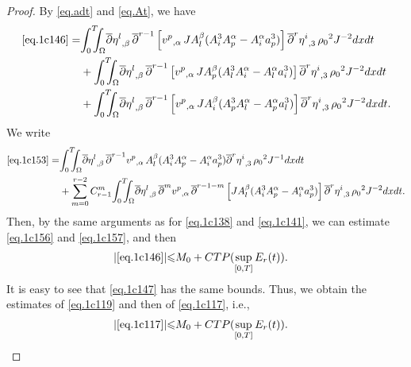 \documentclass[12pt,twoside,reqno]{amsart}
\numberwithin{equation}{section}
\theoremstyle{definition}
\theoremstyle{remark}
\begin{document}
\begin{proof}
By \eqref{eq.adt} and \eqref{eq.At}, we have
\begin{align}
  \eqref{eq.1c146}=&{\int_0^T\!\!\!\!\int_\Omega }  {\overline{\partial}} {{{\eta^l}}_{,{\beta}}\,}{\overline{\partial}}^{r-1}\left[{{{v^p}}_{,{\alpha}}\,}JA^\beta_l(A^3_iA^\alpha_p-A^\alpha_ia^3_p) \right]{{{{\overline{\partial}}^r \eta^i}}_{,{3}}\,}{\rho_0}^2  J^{-2}dxdt\label{eq.1c153}\\
  &+{\int_0^T\!\!\!\!\int_\Omega }  {\overline{\partial}} {{{\eta^l}}_{,{\beta}}\,}{\overline{\partial}}^{r-1}\left[{{{v^p}}_{,{\alpha}}\,}JA^\beta_p(A^3_lA^\alpha_i-A^\alpha_la^3_i) \right]{{{{\overline{\partial}}^r \eta^i}}_{,{3}}\,}{\rho_0}^2  J^{-2}dxdt\label{eq.1c154}\\
  &+{\int_0^T\!\!\!\!\int_\Omega }  {\overline{\partial}} {{{\eta^l}}_{,{\beta}}\,}{\overline{\partial}}^{r-1}\left[{{{v^p}}_{,{\alpha}}\,}JA^\beta_i(A^3_pA^\alpha_l-A^\alpha_pa^3_l) \right]{{{{\overline{\partial}}^r \eta^i}}_{,{3}}\,}{\rho_0}^2  J^{-2}dxdt.\label{eq.1c155}
\end{align}
We write
\begin{align}
  \eqref{eq.1c153}=&{\int_0^T\!\!\!\!\int_\Omega }  {\overline{\partial}} {{{\eta^l}}_{,{\beta}}\,}{\overline{\partial}}^{r-1}{{{v^p}}_{,{\alpha}}\,}A^\beta_l(A^3_iA^\alpha_p-A^\alpha_ia^3_p) {{{{\overline{\partial}}^r \eta^i}}_{,{3}}\,}{\rho_0}^2  J^{-1}dxdt\label{eq.1c156}\\
  &+\sum_{m=0}^{r-2}C_{r-1}^m{\int_0^T\!\!\!\!\int_\Omega }  {\overline{\partial}} {{{\eta^l}}_{,{\beta}}\,}{\overline{\partial}}^m{{{v^p}}_{,{\alpha}}\,}{\overline{\partial}}^{r-1-m}\left[JA^\beta_l(A^3_iA^\alpha_p -A^\alpha_ia^3_p) \right]{{{{\overline{\partial}}^r \eta^i}}_{,{3}}\,}{\rho_0}^2  J^{-2}dxdt.\label{eq.1c157}
\end{align}
Then, by the same arguments as for \eqref{eq.1c138} and \eqref{eq.1c141}, we can estimate \eqref{eq.1c156} and \eqref{eq.1c157}, and then
\begin{align*}
  {\vert{\eqref{eq.1c146}}\vert}{\leqslant} &M_0+CTP(\sup_{[0,T]}E_r(t)).
\end{align*}
It is easy to see that \eqref{eq.1c147} has the same bounds. Thus, we obtain the estimates of \eqref{eq.1c119} and then of \eqref{eq.1c117}, i.e.,
\begin{align*}
  {\vert{\eqref{eq.1c117}}\vert}{\leqslant} &M_0+CTP(\sup_{[0,T]}E_r(t)).
\end{align*}


\end{proof}
\end{document}

